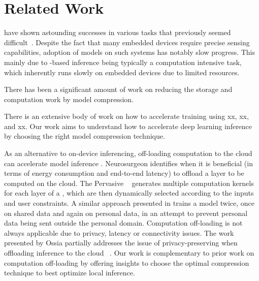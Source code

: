 \section{Related Work}
\DNNs have shown astounding successes in various tasks that previously seemed difficult~\cite{cho2014learning}. Despite the fact that many embedded
devices require precise sensing capabilities, adoption of \DNN models on such systems has notably slow progress. This mainly due to
\DNN-based inference being typically a computation intensive task, which inherently runs slowly on embedded devices due to limited
resources.

There has been a significant amount of work on reducing the storage and computation work by model compression.


There is an extensive body of work on how to accelerate \DNN training using xx, xx, and xx. Our work aims to understand how to accelerate
deep learning inference by choosing the right model compression technique.


As an alternative to on-device inferencing, off-loading computation to the cloud can accelerate \DNN model inference
\cite{teerapittayanon2017distributed}. Neurosurgeon \cite{Kang2017neurosurgeon} identifies when it is beneficial (\eg in terms of energy
consumption and end-to-end latency) to offload a \DNN layer to be computed on the cloud. The Pervasive \CNN~\cite{song2017towards} generates
multiple computation kernels for each layer of a \CNN, which are then dynamically selected according to the inputs and user constraints. A
similar approach presented in \cite{servia2017personal} trains a model twice, once on shared data and again on personal data, in an attempt to
prevent personal data being sent outside the personal domain. Computation off-loading is not always applicable due to privacy, latency or
connectivity issues. The work presented by Ossia \etal partially addresses the issue of privacy-preserving when offloading \DNN inference
to the cloud ~\cite{osia2017hybrid}. Our work is complementary to prior work on computation off-loading by offering insights to choose the
optimal compression technique to best optimize local inference.
